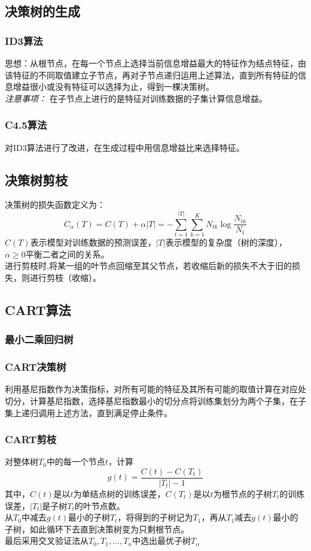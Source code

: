 \documentclass[UTF8]{article}%
\begin{document}
	\subsection{决策树的生成}
	\subsubsection{ID3算法}
	思想：从根节点，在每一个节点上选择当前信息增益最大的特征作为结点特征，由该特征的不同取值建立子节点，再对子节点递归运用上述算法，直到所有特征的信息增益很小或没有特征可以选择为止，得到一棵决策树。\\
	\emph{注意事项： }在子节点上进行的是特征对训练数据的子集计算信息增益。
	\subsubsection{C4.5算法}
	对ID3算法进行了改进，在生成过程中用信息增益比来选择特征。
	\subsection{决策树剪枝}
	决策树的损失函数定义为：
	$$C_\alpha(T)=C(T)+\alpha|T|
				 =-\sum_{t=1}^{|T|}\sum_{k=1}^{K}N_{tk}\log\frac{N_{tk}}{N_t}$$
	$C(T)$表示模型对训练数据的预测误差，$|T|$表示模型的复杂度（树的深度），$\alpha\geq0$平衡二者之间的关系。
	\\进行剪枝时,将某一组的叶节点回缩至其父节点，若收缩后新的损失不大于旧的损失，则进行剪枝（收缩）。
	\subsection{CART算法}
	\subsubsection{最小二乘回归树}
	\newpage
	\subsubsection{CART决策树}
	利用基尼指数作为决策指标，对所有可能的特征及其所有可能的取值计算在对应处切分，计算基尼指数，选择基尼指数最小的切分点将训练集划分为两个子集，在子集上递归调用上述方法，直到满足停止条件。
	\subsubsection{CART剪枝}
	对整体树$T_0$中的每一个节点$t$，计算$$g(t)=\frac{C(t)-C(T_t)}{|T_t|-1}$$
	其中，$C(t)$是以$t$为单结点树的训练误差，$C(T_t)$是以$t$为根节点的子树$T_t$的训练误差，$|T_t|$是子树$T_t$的叶节点数。
	\\从$T_0$中减去$g(t)$最小的子树$T_t$，将得到的子树记为$T_1$，再从$T_1$减去$g(t)$最小的子树，如此循环下去直到决策树变为只剩根节点。
	\\最后采用交叉验证法从$T_0,T_1,...,T_n$中选出最优子树$T_\alpha$
	
\end{document}

